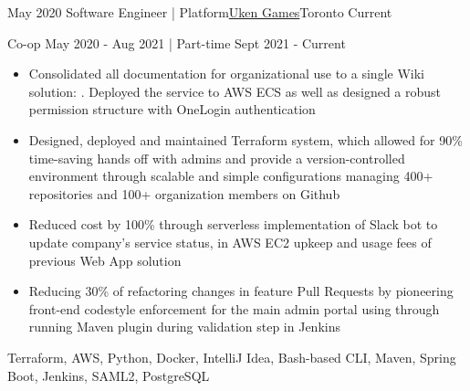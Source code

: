 %
%
%
\begin{experiences}
  \experience
    {May 2020}   {Software Engineer | Platform}{\href{https://uken.com}{Uken Games}}{Toronto}
    {Current} {
                    Co-op May 2020 - Aug 2021 | Part-time Sept 2021 - Current
                    \begin{itemize}
                        \item Consolidated all documentation for organizational use to a single Wiki solution: . Deployed the service to AWS ECS as well as designed a robust permission structure with OneLogin authentication 
                        
                        \item Designed, deployed and maintained Terraform system, which allowed for 90\% time-saving hands off with admins and provide a version-controlled environment through scalable and simple configurations managing 400+ repositories and 100+ organization members on Github
                        
                        \item Reduced cost by 100\% through serverless implementation of Slack bot to update company's service status, in AWS EC2 upkeep and usage fees of previous Web App solution
                        
                        \item Reducing 30\% of refactoring changes in feature Pull Requests by pioneering front-end codestyle enforcement for the main admin portal using   through running Maven plugin during validation step in Jenkins
                    \end{itemize}
                    }
                    {Terraform, AWS, Python, Docker, IntelliJ Idea, Bash-based CLI, Maven, Spring Boot, Jenkins, SAML2, PostgreSQL}
\end{experiences}

